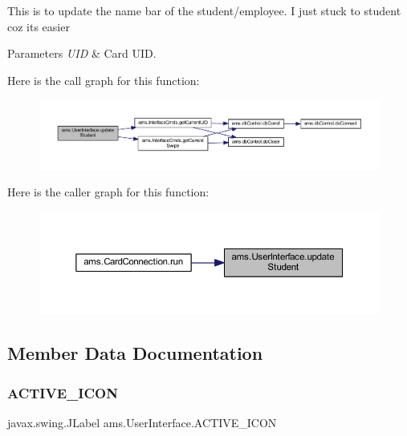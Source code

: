 This is to update the name bar of the student/employee. I just stuck to student coz it\textquotesingle{}s easier 
\begin{DoxyParams}{Parameters}
{\em U\+ID} & Card U\+ID. \\
\hline
\end{DoxyParams}
Here is the call graph for this function\+:\nopagebreak
\begin{figure}[H]
\begin{center}
\leavevmode
\includegraphics[width=350pt]{classams_1_1_user_interface_a2c095e5b4874956fc7831b9986656130_cgraph}
\end{center}
\end{figure}
Here is the caller graph for this function\+:\nopagebreak
\begin{figure}[H]
\begin{center}
\leavevmode
\includegraphics[width=350pt]{classams_1_1_user_interface_a2c095e5b4874956fc7831b9986656130_icgraph}
\end{center}
\end{figure}


\subsection{Member Data Documentation}
\mbox{\label{classams_1_1_user_interface_a0b8f1d9a42b069d55e7e686d85e9d912}} 
\subsubsection{\texorpdfstring{ACTIVE\_ICON}{ACTIVE\_ICON}}
{\footnotesize\ttfamily javax.\+swing.\+J\+Label ams.\+User\+Interface.\+A\+C\+T\+I\+V\+E\+\_\+\+I\+C\+ON\hspace{0.3cm}{\ttfamily [static]}}

